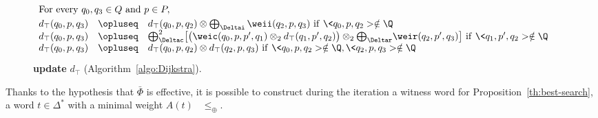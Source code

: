 \begin{figure}[ht]
\(
\begin{array}{lcl}
\multicolumn{3}{l}{%
 \mbox{For~every}\  q_0, q_3 \in Q\ \mbox{and}\ p \in P,}\\[1mm] %
d_\top(q_0, p, q_3) & \opluseq &
  d_\top(q_0, p, q_2) \otimes
  \bigoplus_{\Deltai} \weii(q_2, p, q_3)\
  \mathrm{if~} \< q_0, p, q_2> \notin \Q \\
d_\top(q_0, p, q_3) & \opluseq &
  {\bigoplus^2_{\Deltac}}
  \bigl[ \bigl( \weic(q_0, p, p', q_1) \otimes_2
  d_\top(q_1, p', q_2) \bigr) \otimes_2
  {\bigoplus_{\Deltar}} \weir(q_2, p', q_3) \bigr]\
  \mathrm{if~} \< q_1, p', q_2> \notin \Q \\
%
d_\top(q_0, p, q_3) & \opluseq &
  d_\top(q_0, p, q_2) \otimes d_\top(q_2, p, q_3)\ 
  \mathrm{if~} \< q_0, p, q_2> \notin \Q, \< q_2, p, q_3> \notin \Q \\[-1mm]
\end{array}
\)
%
\caption{\textbf{update} $d_\top$ (Algorithm~\ref{algo:Dijkstra}).}
\label{fig:best-update-top}
\end{figure}
%
Thanks to the hypothesis that $\bar\Phi$ is effective, 
it is possible to construct during the iteration a witness word
for Proposition~\ref{th:best-search}, 
\ie a word $t \in \Delta^*$ with a minimal weight $A(t)$ \wrt~$\leq_\oplus$.



